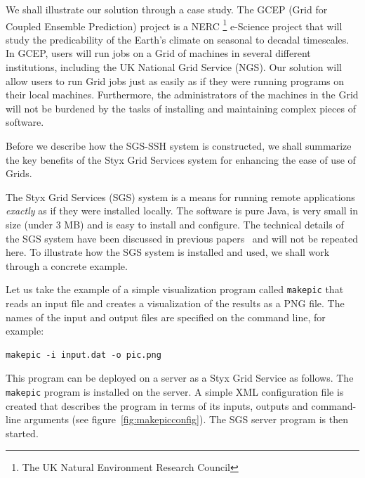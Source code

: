 \documentclass[times,10pt,twocolumn,8.5x11]{article}
\begin{document}
We shall illustrate our solution through a case study.  The GCEP (Grid for Coupled Ensemble Prediction) project is a NERC \footnote{The UK Natural Environment Research Council} e-Science project that will study the predicability of the Earth's climate on seasonal to decadal timescales.  In GCEP, users will run jobs on a Grid of machines in several different institutions, including the UK National Grid Service (NGS).  Our solution will allow users to run Grid jobs just as easily as if they were running programs on their local machines.  Furthermore, the administrators of the machines in the Grid will not be burdened by the tasks of installing and maintaining complex pieces of software.

Before we describe how the SGS-SSH system is constructed, we shall summarize the key benefits of the Styx Grid Services system for enhancing the ease of use of Grids.


The Styx Grid Services (SGS) system is a means for running remote applications {\em exactly\/} as if they were installed locally.  The software is pure Java, is very small in size (under 3 MB) and is easy to install and configure.  The technical details of the SGS system have been discussed in previous papers~\cite{blower:2005,blower:2006} and will not be repeated here.  To illustrate how the SGS system is installed and used, we shall work through a concrete example.

Let us take the example of a simple visualization program called {\tt makepic} that reads an input file and creates a visualization of the results as a PNG file.  The names of the input and output files are specified on the command line, for example:

\begin{verbatim}
makepic -i input.dat -o pic.png
\end{verbatim}

This program can be deployed on a server as a Styx Grid Service as follows.  The {\tt makepic} program is installed on the server.  A simple XML configuration file is created that describes the program in terms of its inputs, outputs and command-line arguments (see figure~\ref{fig:makepicconfig}).  The SGS server program is then started.
\end{document}
